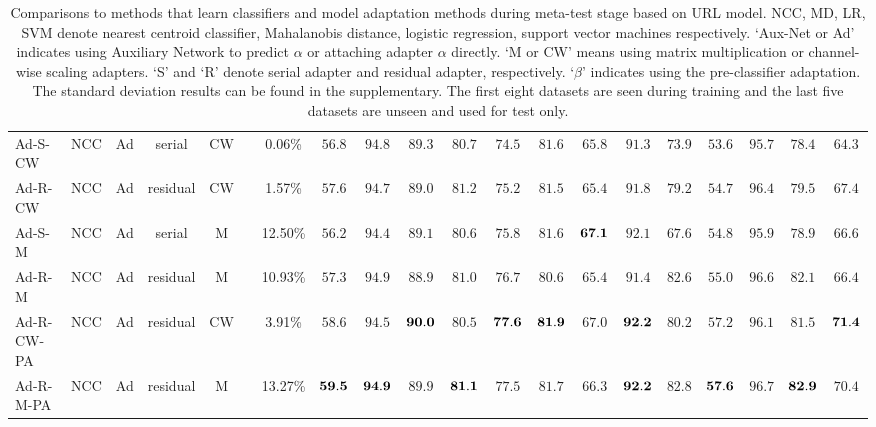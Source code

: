 \begin{table*}[ht!]
{\begin{tabular}{lcccccccccccccc|ccccc}
		    \midrule
		    Ad-S-CW & NCC & Ad & serial & CW & \XSolidBrush & 0.06\% & $56.8$ & $94.8$ & $89.3$ & $80.7$ & $74.5$ & $81.6$ & $65.8$ & $91.3$ & $73.9$ & $53.6$ & $95.7$ & $78.4$ & $64.3$ \\
		    Ad-R-CW & NCC & Ad & residual & CW & \XSolidBrush & 1.57\%   & $57.6$ & $94.7$ & $89.0$ & $81.2$ & $75.2$ & $81.5$ & $65.4$ & $91.8$ & $79.2$ & $54.7$ & $96.4$ & $79.5$ & $67.4$ \\
		    Ad-S-M  & NCC & Ad & serial & M & \XSolidBrush & 12.50\% & $56.2$ & $94.4$ & $89.1$ & $80.6$ & $75.8$ & $81.6$ & ${\bf 67.1}$ & $92.1$ & $67.6$ & $54.8$ & $95.9$ & $78.9$ & $66.6$ \\

		    Ad-R-M & NCC & Ad & residual & M & \XSolidBrush & 10.93\%  & $57.3$ & $94.9$ & $88.9$ & $81.0$ & $76.7$ & $80.6$ & $65.4$ & $91.4$ & $82.6$ & $55.0$ & $96.6$ & $82.1$ & $66.4$ \\
			\midrule
		    Ad-R-CW-PA & NCC & Ad & residual & CW & \Checkmark & 3.91\% & $58.6$ & $94.5$ & ${\bf 90.0}$ & $80.5$ & ${\bf 77.6}$ & ${\bf 81.9}$ & $67.0$ & ${\bf 92.2}$ & $80.2$ & $57.2$ & $96.1$ & $81.5$ & ${\bf 71.4}$ \\
		    Ad-R-M-PA & NCC & Ad & residual & M & \Checkmark & 13.27\% & ${\bf 59.5}$ & ${\bf94.9}$ & $89.9$ & ${\bf 81.1}$ & $77.5$ & $81.7$ & $66.3$ & ${\bf 92.2}$ & $82.8$ & ${\bf 57.6}$ & $96.7$ & ${\bf 82.9}$ & $70.4$ \\
			\bottomrule
		\end{tabular}%
			}
		\vspace{-0.35cm}
		\caption{Comparisons to methods that learn classifiers and model adaptation methods during meta-test stage based on URL model. NCC, MD, LR, SVM denote nearest centroid classifier, Mahalanobis distance, logistic regression, support vector machines respectively. `Aux-Net or Ad' indicates using Auxiliary Network to predict $\alpha$ or attaching adapter $\alpha$ directly. `M or CW' means using matrix multiplication or channel-wise scaling adapters. `S' and `R' denote serial adapter and residual adapter, respectively. `$\beta$' indicates using the pre-classifier adaptation. The standard deviation results can be found in the supplementary. The first eight datasets are seen during training and the last five datasets are unseen and used for test only. 
		}
		\label{tab:testad}
\end{table*}%

